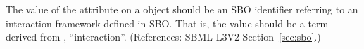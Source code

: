 The value of the attribute  on a \Model object should be an
SBO identifier referring to an interaction framework defined in SBO.  That
is, the value should be a term derived from \sbointeractionID,
``interaction''.  (References: SBML L3V2 Section~\ref{sec:sbo}.)
